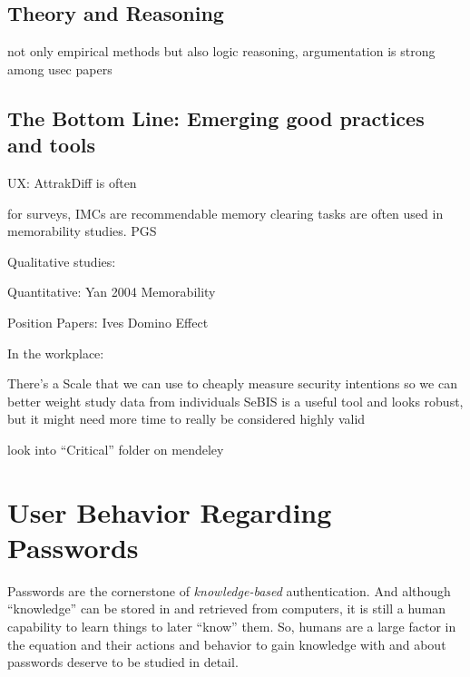 \subsection{Theory and Reasoning}
not only empirical methods but also logic reasoning, argumentation is strong among usec papers


\subsection{The Bottom Line: Emerging good practices and tools}

UX: AttrakDiff is often 

for surveys, IMCs are recommendable \cite{Oppenheimer2009InstructionalManipulationChecks}
memory clearing tasks are often used in memorability studies.
PGS 


Qualitative studies:

Quantitative: 
Yan 2004 Memorability \cite{Yan2004PasswordMemorabilitySecurity}

Position Papers:
Ives Domino Effect \cite{Ives2004DominoEffectReuse}

In the workplace: \cite{Adams1997MakingPWsSecureAndUsable, Inglesant2010TrueCostOfUnusablePolicies}



			
	
	There's a Scale that we can use to cheaply measure security intentions so we can better weight study data from individuals \cite{Egelman2015SeBIS}
	SeBIS is a useful tool and looks robust, but it might need more time to really be considered highly valid \cite{Egelman2016BehaviorEverFollows}

	look into ``Critical'' folder on mendeley
	


	
\section{User Behavior Regarding Passwords}\label{sec:rw:how-users-cope}
Passwords are the cornerstone of \textit{knowledge-based} authentication. And although ``knowledge'' can be stored in and retrieved from computers, it is still a human capability to learn things to later ``know'' them. So, humans are a large factor in the equation and their actions and behavior to gain knowledge with and about passwords deserve to be studied in detail. 

